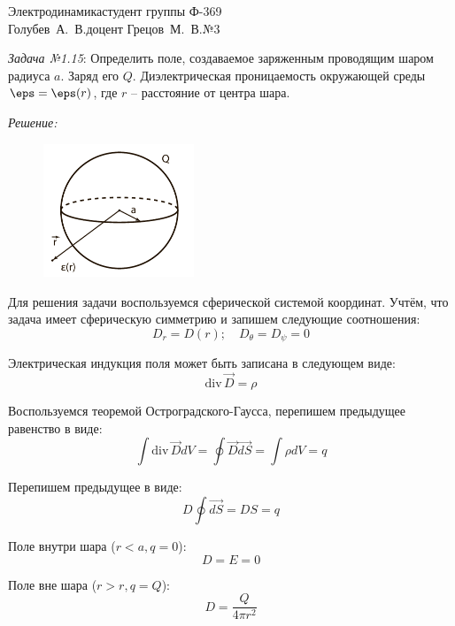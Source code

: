 




\usepackage{wrapfig}

\newcommand{\rot}{\mathrm{rot}\,}


{Электродинамика}{студент группы Ф-369\\Голубев~А.~В.}{доцент Грецов~М.~В.}{№3}

\newcommand{\grad}{\mathrm{grad}\,}
\renewcommand{\div}{\mathrm{div}\,}

\newpage

\emph{Задача №1.15}: Определить поле, создаваемое заряженным проводящим шаром 
радиуса \( a \). Заряд его \( Q \). Диэлектрическая проницаемость окружающей 
среды \( \eps = \eps(r) \), где \( r \) -- расстояние от центра шара.

\emph{Решение:} 

\begin{figure}
	\vspace{-2ex}
	\includegraphics[width=0.4\textwidth]{pdf/image_1_15}
\end{figure}

Для решения задачи воспользуемся сферической системой координат. Учтём, что 
задача имеет сферическую симметрию и запишем следующие соотношения:
\[
	D_r = D(r);\quad
	D_\theta = D_\psi = 0
\]

Электрическая индукция поля может быть записана в следующем виде:
\[
	\div{\vec{D}} = \rho
\]

Воспользуемся теоремой Остроградского-Гаусса, перепишем предыдущее равенство 
в виде:
\[
	\int \div\vec{D} dV = \oint \vec{D}\vec{dS} = \int \rho dV = q
\]

Перепишем предыдущее в виде:
\[
	D \oint\vec{dS} = DS = q
\]

Поле внутри шара (\( r < a, q = 0 \)):
\[
	D = E = 0
\]

Поле вне шара (\( r > r, q = Q \)):
\[
	D = \frac{Q}{4\pi r^2}
\]

